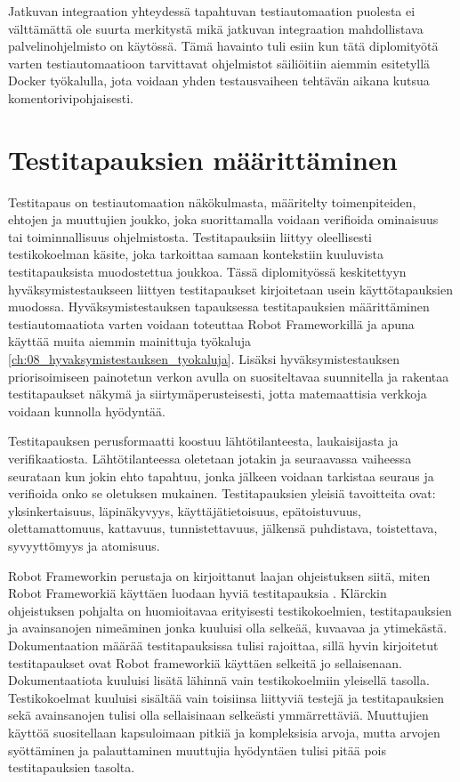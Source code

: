     Jatkuvan integraation yhteydessä tapahtuvan testiautomaation puolesta ei välttämättä ole suurta merkitystä mikä jatkuvan integraation mahdollistava palvelinohjelmisto on käytössä.
    Tämä havainto tuli esiin kun tätä diplomityötä varten testiautomaatioon tarvittavat ohjelmistot säiliöitiin aiemmin esitetyllä Docker työkalulla, jota voidaan yhden testausvaiheen tehtävän aikana kutsua komentorivipohjaisesti.

\section{Testitapauksien määrittäminen} \label{ch:08_testitapauksien_maarittaminen}

  Testitapaus on testiautomaation näkökulmasta, määritelty toimenpiteiden, ehtojen ja muuttujien joukko, joka suorittamalla voidaan verifioida ominaisuus tai toiminnallisuus ohjelmistosta.
  Testitapauksiin liittyy oleellisesti testikokoelman käsite, joka tarkoittaa samaan kontekstiin kuuluvista testitapauksista muodostettua joukkoa.
  Tässä diplomityössä keskitettyyn hyväksymistestaukseen liittyen testitapaukset kirjoitetaan usein käyttötapauksien muodossa.
  Hyväksymistestauksen tapauksessa testitapauksien määrittäminen testiautomaatiota varten voidaan toteuttaa Robot Frameworkillä ja apuna käyttää muita aiemmin  mainittuja työkaluja \ref{ch:08_hyvaksymistestauksen_tyokaluja}.
  Lisäksi hyväksymistestauksen priorisoimiseen painotetun verkon avulla on suositeltavaa suunnitella ja rakentaa testitapaukset näkymä ja siirtymäperusteisesti, jotta matemaattisia verkkoja voidaan kunnolla hyödyntää.

  Testitapauksen perusformaatti koostuu lähtötilanteesta, laukaisijasta ja verifikaatiosta.
  Lähtötilanteessa oletetaan jotakin ja seuraavassa vaiheessa seurataan kun jokin ehto tapahtuu, jonka jälkeen voidaan tarkistaa seuraus ja verifioida onko se oletuksen mukainen.
  Testitapauksien yleisiä tavoitteita ovat: yksinkertaisuus, läpinäkyvyys, käyttäjätietoisuus, epätoistuvuus, olettamattomuus, kattavuus, tunnistettavuus, jälkensä puhdistava, toistettava, syvyyttömyys ja atomisuus.

  Robot Frameworkin perustaja on kirjoittanut laajan ohjeistuksen siitä, miten Robot Frameworkiä käyttäen luodaan hyviä testitapauksia \parencite{klarck_how-to-write-good-test-cases_2019}.
  Klärckin ohjeistuksen pohjalta on huomioitavaa erityisesti testikokoelmien, testitapauksien ja avainsanojen nimeäminen jonka kuuluisi olla selkeää, kuvaavaa ja ytimekästä.
  Dokumentaation määrää testitapauksissa tulisi rajoittaa, sillä hyvin kirjoitetut testitapaukset ovat Robot frameworkiä käyttäen selkeitä jo sellaisenaan.
  Dokumentaatiota kuuluisi lisätä lähinnä vain testikokoelmiin yleisellä tasolla.
  Testikokoelmat kuuluisi sisältää vain toisiinsa liittyviä testejä ja testitapauksien sekä avainsanojen tulisi olla sellaisinaan selkeästi ymmärrettäviä.
  Muuttujien käyttöä suositellaan kapsuloimaan pitkiä ja kompleksisia arvoja, mutta arvojen syöttäminen ja palauttaminen muuttujia hyödyntäen tulisi pitää pois testitapauksien tasolta.

